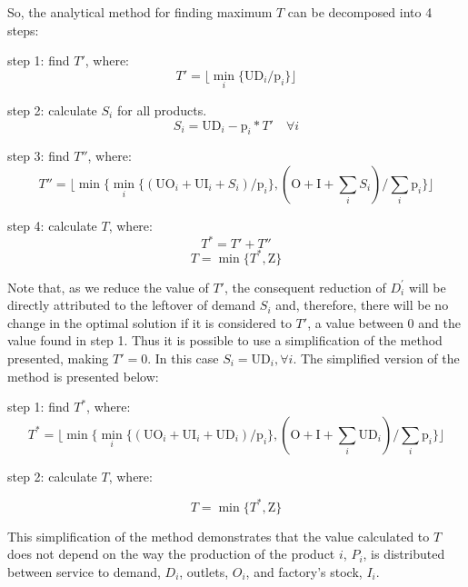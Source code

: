 \documentclass[10pt,fleqn,a4paper,twoside]{article}
\begin{document}
So, the analytical method for finding maximum $T$ can be decomposed into 4 steps:

step 1: find $T'$, where:
\begin{equation}
T' = \lfloor{\min_{i} \{\textrm{UD}_i / \textrm{p}_i\}}\rfloor
\end{equation}

step 2: calculate $S_i$ for all products.
\begin{equation}
\label{eq:unmet}
S_i = \textrm{UD}_i - \textrm{p}_i * T' \quad \forall i
\end{equation}

step 3: find $T''$, where:
\begin{equation}
T'' = \lfloor{\min \{\min_{i} \{(\textrm{UO}_i + \textrm{UI}_i + S_i) / \textrm{p}_i\},(\textrm{O} + \textrm{I} + \sum_i {S_i}) / \sum_i {\textrm{p}_i}\}}\rfloor
\end{equation}

step 4: calculate $T$, where: 
\begin{equation}
T^* = T' + T''
\end{equation}
\begin{equation}
T = \min \{T^* , \textrm{Z}\}
\end{equation}

Note that, as we reduce the value of $T'$, the consequent reduction of $D_{i}^{'}$ will be directly attributed to the leftover of demand $S_i$ and, therefore, there will be no change in the optimal solution if it is considered to $T'$, a value between 0 and the value found in step 1. Thus it is possible to use a simplification of the method presented, making $T' = 0$. In this case $S_i = \textrm{UD}_i, \forall i$. The simplified version of the method is presented below:

step 1: find $T^*$, where:
\begin{equation}
T^* = \lfloor{\min \{\min_{i} \{(\textrm{UO}_i + \textrm{UI}_i + \textrm{UD}_i) / \textrm{p}_i\},(\textrm{O} + \textrm{I} + \sum_i \textrm{UD}_i) / \sum_i {\textrm{p}_i}\}}\rfloor
\end{equation}

step 2: calculate $T$, where: 

\begin{equation}
T = \min \{T^* , \textrm{Z}\}
\end{equation}

This simplification of the method demonstrates that the value calculated to $T$ does not depend on the way the production of the product $i$, $P_i$, is distributed between service to demand, $D_i$, outlets, $O_i$, and  factory's stock, $I_i$.
\end{document}
